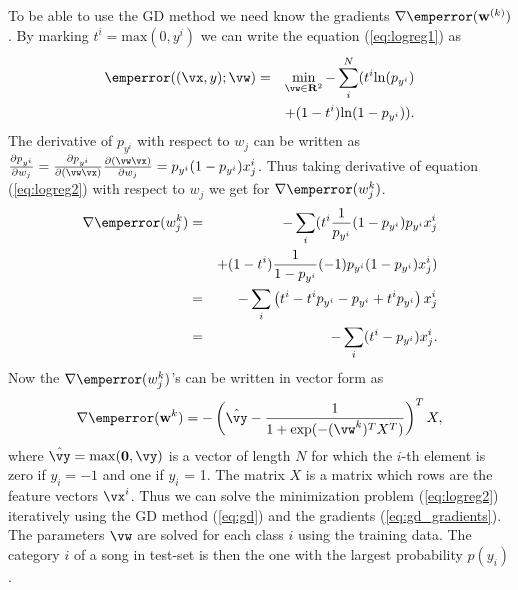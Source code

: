 \documentclass[aps,prb,10pt,twocolumn,groupedaddress]{revtex4-1}
\begin{document}
To be able to use the GD method we need know the gradients  $\nabla \emperror(\mathbf{w}^{(k)})$.
By marking $t^i=\mathrm{max}(0,y^i)$ we can write the equation (\ref{eq:logreg1}) as
\begin{eqnarray}
  \emperror((\vx,y);\vw)&=&\min\limits_{\vw \in \mathbf{R}^{2}}-\sum_i^N(t^i\mathrm{ln}(p_{y^i})\nonumber\\
  & &+(1-t^i)\mathrm{ln}(1-p_{y^i})).
  \label{eq:logreg2}
\end{eqnarray}
The derivative of $p_{y^i}$ with respect to $w_j$ can be written as $\frac{\partial p_{y^i}}{\partial w_j}=\frac{\partial p_{y^i}}{\partial (\vw\vx)}\frac{\partial (\vw\vx)}{\partial w_j} = p_{y^i}(1-p_{y^i})x_j^i$. Thus taking derivative of equation (\ref{eq:logreg2}) with
respect to $w_j$ we get for $\nabla \emperror(w_j^k)$.
\begin{eqnarray}
  \nabla \emperror(w_j^k) &=&-\sum_i(t^i\frac{1}{p_{y^i}}(1-p_{y^i})p_{y^i}x_j^i\nonumber\\
  & &+(1-t^i)\frac{1}{1-p_{y^i}}(-1)p_{y^i}(1-p_{y^i})x_j^i)\nonumber\\
  &=&-\sum_i\left(t^i -t^ip_{y^i}-p_{y^i}+t^ip_{y^i}\right)x_j^i\nonumber\\
  &=&-\sum_i(t^i-p_{y^i})x_j^i.
\end{eqnarray}
Now the $\nabla \emperror(w_j^k)$'s can be written in vector form as
\begin{equation}
  \nabla \emperror(\mathbf{w}^k) = -\left(\hat{\vy}-\frac{1}{1+\mathrm{exp}(-(\vw^{k})^T X^T)}\right)^TX,
  \label{eq:gd_gradients}
\end{equation}
where $\hat{\vy} = \mathrm{max}(\mathbf{0},\vy)$ is a vector of length $N$ for which the
$i$-th element is zero if $y_i=-1$ and one if $y_i$ = 1. The matrix $X$ is a
matrix which rows are the feature vectors $\vx^i$. Thus we can solve the
minimization problem (\ref{eq:logreg2}) iteratively using the GD
method (\ref{eq:gd}) and the gradients (\ref{eq:gd_gradients}).
The parameters $\vw$ are solved for each class $i$ using the training data. The
category $i$ of a song in test-set is then the one with the largest probability
$p(y_i)$.
\end{document}
